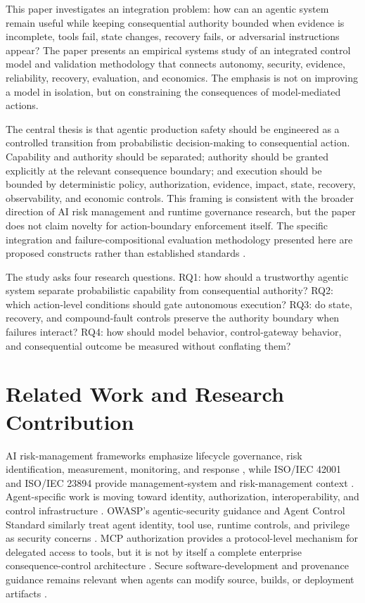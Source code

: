 \documentclass[conference]{IEEEtran}
\begin{document}
This paper investigates an integration problem: how can an agentic system remain useful while keeping consequential authority bounded when evidence is incomplete, tools fail, state changes, recovery fails, or adversarial instructions appear? The paper presents an empirical systems study of an integrated control model and validation methodology that connects autonomy, security, evidence, reliability, recovery, evaluation, and economics. The emphasis is not on improving a model in isolation, but on constraining the consequences of model-mediated actions.

The central thesis is that agentic production safety should be engineered as a controlled transition from probabilistic decision-making to consequential action. Capability and authority should be separated; authority should be granted explicitly at the relevant consequence boundary; and execution should be bounded by deterministic policy, authorization, evidence, impact, state, recovery, observability, and economic controls. This framing is consistent with the broader direction of AI risk management and runtime governance research, but the paper does not claim novelty for action-boundary enforcement itself. The specific integration and failure-compositional evaluation methodology presented here are proposed constructs rather than established standards \cite{r1,r2,r3,r15,r16,r18}.

The study asks four research questions. RQ1: how should a trustworthy agentic system separate probabilistic capability from consequential authority? RQ2: which action-level conditions should gate autonomous execution? RQ3: do state, recovery, and compound-fault controls preserve the authority boundary when failures interact? RQ4: how should model behavior, control-gateway behavior, and consequential outcome be measured without conflating them?

\section{Related Work and Research Contribution}
AI risk-management frameworks emphasize lifecycle governance, risk identification, measurement, monitoring, and response \cite{r1,r2}, while ISO/IEC 42001 and ISO/IEC 23894 provide management-system and risk-management context \cite{r3,r6}. Agent-specific work is moving toward identity, authorization, interoperability, and control infrastructure \cite{r4,r5}. OWASP's agentic-security guidance and Agent Control Standard similarly treat agent identity, tool use, runtime controls, and privilege as security concerns \cite{r7,r8}. MCP authorization provides a protocol-level mechanism for delegated access to tools, but it is not by itself a complete enterprise consequence-control architecture \cite{r9}. Secure software-development and provenance guidance remains relevant when agents can modify source, builds, or deployment artifacts \cite{r10,r11,r12}.
\end{document}

